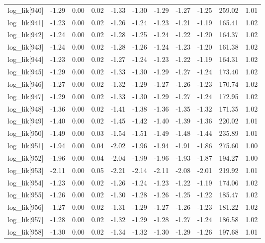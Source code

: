 \begin{table}[ht]
\begin{tabular}{rrrrrrrrrrr}
  log\_lik[940] & -1.29 & 0.00 & 0.02 & -1.33 & -1.30 & -1.29 & -1.27 & -1.25 & 259.02 & 1.01 \\ 
  log\_lik[941] & -1.23 & 0.00 & 0.02 & -1.26 & -1.24 & -1.23 & -1.21 & -1.19 & 165.41 & 1.02 \\ 
  log\_lik[942] & -1.24 & 0.00 & 0.02 & -1.28 & -1.25 & -1.24 & -1.22 & -1.20 & 164.37 & 1.02 \\ 
  log\_lik[943] & -1.24 & 0.00 & 0.02 & -1.28 & -1.26 & -1.24 & -1.23 & -1.20 & 161.38 & 1.02 \\ 
  log\_lik[944] & -1.23 & 0.00 & 0.02 & -1.27 & -1.24 & -1.23 & -1.22 & -1.19 & 164.31 & 1.02 \\ 
  log\_lik[945] & -1.29 & 0.00 & 0.02 & -1.33 & -1.30 & -1.29 & -1.27 & -1.24 & 173.40 & 1.02 \\ 
  log\_lik[946] & -1.27 & 0.00 & 0.02 & -1.32 & -1.29 & -1.27 & -1.26 & -1.23 & 170.74 & 1.02 \\ 
  log\_lik[947] & -1.29 & 0.00 & 0.02 & -1.33 & -1.30 & -1.29 & -1.27 & -1.24 & 172.95 & 1.02 \\ 
  log\_lik[948] & -1.36 & 0.00 & 0.02 & -1.41 & -1.38 & -1.36 & -1.35 & -1.32 & 171.35 & 1.02 \\ 
  log\_lik[949] & -1.40 & 0.00 & 0.02 & -1.45 & -1.42 & -1.40 & -1.39 & -1.36 & 220.02 & 1.01 \\ 
  log\_lik[950] & -1.49 & 0.00 & 0.03 & -1.54 & -1.51 & -1.49 & -1.48 & -1.44 & 235.89 & 1.01 \\ 
  log\_lik[951] & -1.94 & 0.00 & 0.04 & -2.02 & -1.96 & -1.94 & -1.91 & -1.86 & 275.60 & 1.00 \\ 
  log\_lik[952] & -1.96 & 0.00 & 0.04 & -2.04 & -1.99 & -1.96 & -1.93 & -1.87 & 194.27 & 1.00 \\ 
  log\_lik[953] & -2.11 & 0.00 & 0.05 & -2.21 & -2.14 & -2.11 & -2.08 & -2.01 & 219.92 & 1.01 \\ 
  log\_lik[954] & -1.23 & 0.00 & 0.02 & -1.26 & -1.24 & -1.23 & -1.22 & -1.19 & 174.06 & 1.02 \\ 
  log\_lik[955] & -1.26 & 0.00 & 0.02 & -1.30 & -1.28 & -1.26 & -1.25 & -1.22 & 185.47 & 1.02 \\ 
  log\_lik[956] & -1.27 & 0.00 & 0.02 & -1.31 & -1.29 & -1.27 & -1.26 & -1.23 & 181.22 & 1.02 \\ 
  log\_lik[957] & -1.28 & 0.00 & 0.02 & -1.32 & -1.29 & -1.28 & -1.27 & -1.24 & 186.58 & 1.02 \\ 
  log\_lik[958] & -1.30 & 0.00 & 0.02 & -1.34 & -1.32 & -1.30 & -1.29 & -1.26 & 197.68 & 1.01 \\ 

\end{tabular}
\end{table}
